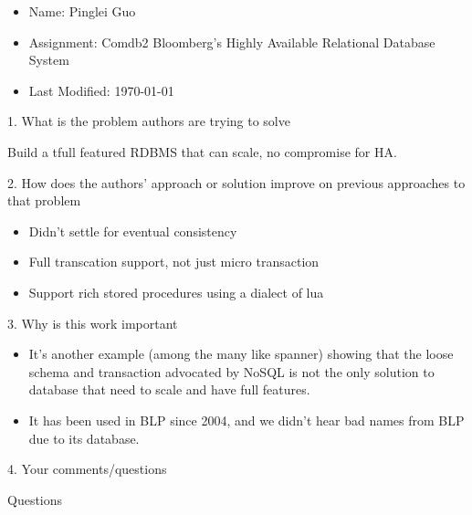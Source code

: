 \documentclass[12pt,a4paper,oneside]{article}
\begin{document}
\begin{itemize}
  \item Name: Pinglei Guo
  \item Assignment: Comdb2 Bloomberg's Highly Available Relational Database System
  \item Last Modified: \today
\end{itemize}

1. What is the problem authors are trying to solve

\medskip

Build a tfull featured RDBMS that can scale, no compromise for HA.

\bigskip

2. How does the authors’ approach or solution improve on previous approaches to that problem

\medskip

\begin{itemize}
  \item Didn't settle for eventual consistency
  \item Full transcation support, not just micro transaction
  \item Support rich stored procedures using a dialect of lua
\end{itemize}

\bigskip

3. Why is this work important

\medskip

\begin{itemize}
  \item It's another example (among the many like spanner) showing that the loose schema and transaction advocated by NoSQL
  is not the only solution to database that need to scale and have full features.
  \item It has been used in BLP since 2004, and we didn't hear bad names from BLP due to its database.
\end{itemize}

\bigskip

4. Your comments/questions

\medskip

Questions
\end{document}
